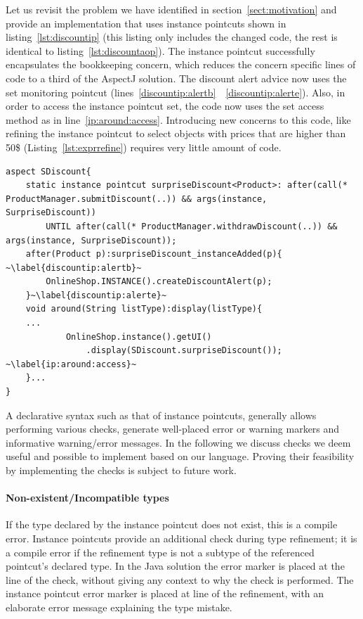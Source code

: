Let us revisit the problem we have identified in section~\ref{sect:motivation} and provide an implementation that uses instance pointcuts shown in listing~\ref{lst:discountip} (this listing only includes the changed code, the rest is identical to listing~\ref{lst:discountaop}). The instance pointcut  successfully encapsulates the bookkeeping concern, which reduces the concern specific lines of code to a third of the AspectJ solution. The discount alert advice now uses the  set monitoring pointcut (lines~\ref{discountip:alertb}~\textendash~\ref{discountip:alerte}). Also, in order to access the instance pointcut set, the code now uses the set access method as in line~\ref{ip:around:access}. Introducing new concerns to this code, like refining the  instance pointcut to select objects with prices that are higher than 50\$ (Listing~\ref{lst:exprrefine}) requires very little amount of code.

\begin{lstlisting}[float=h, moreemph=instance, caption={The instance pointcut implementation of the discount alert concern}, label={lst:discountip}]
aspect SDiscount{
	static instance pointcut surpriseDiscount<Product>: after(call(* ProductManager.submitDiscount(..)) && args(instance, SurpriseDiscount))
		UNTIL after(call(* ProductManager.withdrawDiscount(..)) && args(instance, SurpriseDiscount));
	after(Product p):surpriseDiscount_instanceAdded(p){ ~\label{discountip:alertb}~
		OnlineShop.INSTANCE().createDiscountAlert(p);
	}~\label{discountip:alerte}~
	void around(String listType):display(listType){
	...
			OnlineShop.instance().getUI()
				.display(SDiscount.surpriseDiscount()); ~\label{ip:around:access}~
	}...
}
\end{lstlisting}

A declarative syntax such as that of instance pointcuts, generally allows performing various checks, generate well-placed error or warning markers and informative warning/error messages.
In the following we discuss checks we deem useful and possible to implement based on our language.
Proving their feasibility by implementing the checks is subject to future work.

\paragraph*{Non-existent/Incompatible types} If the type declared by the instance pointcut does not exist, this is a compile error. Instance pointcuts provide an additional check during type refinement; it is a compile error if the refinement type is not a subtype of the referenced pointcut's declared type. In the Java solution the error marker is placed at the line of the  check, without giving any context to why the  check is performed. The instance pointcut error marker is placed at line of the refinement, with an elaborate error message explaining the type mistake.

